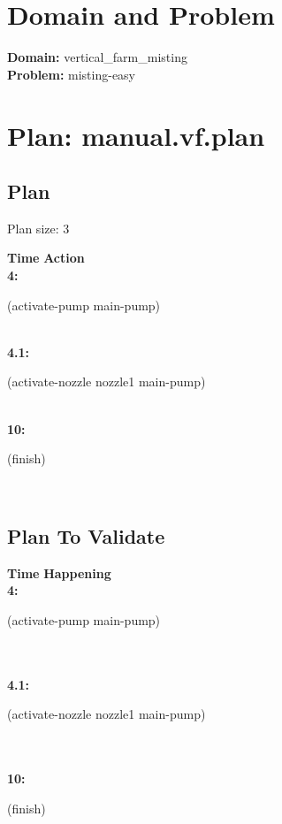 \documentclass[a4paper,12pt]{article}
\author{\mbox{\sc {\sc Val}}}
\newcommand{\headingtimeaction}{{\bf Time} \qquad \= {\bf Action}\\[0.8ex]}
\newcommand{\headingtimehappening}{{\bf Time} \qquad \= {\bf Happening}\\[0.8ex]}
\newcommand{\atime}[1]{{\bf #1:}}
\newcommand{\action}[1]{{\sf #1}}
\newcommand{\listrow}[1]{\begin{minipage}[t]{11.5cm} #1 \end{minipage}}
\begin{document}
 \maketitle 
\section{Domain and Problem}
{\bf Domain:} vertical\_farm\_misting\\
{\bf Problem:} misting-easy
\section{\sloppy Plan: manual.vf.plan}
\subsection{Plan}
Plan size: 3
\begin{tabbing}
\headingtimeaction 
\atime{4} \> \listrow{\action{(activate-pump main-pump)}}\\
\atime{4.1} \> \listrow{\action{(activate-nozzle nozzle1 main-pump)}}\\
\atime{10} \> \listrow{\action{(finish)}}\\
\end{tabbing}
\subsection{Plan To Validate}
\begin{tabbing}
\headingtimehappening 
\atime{4}  \> \listrow{\action{(activate-pump main-pump)}}\\
\\\atime{4.1}  \> \listrow{\action{(activate-nozzle nozzle1 main-pump)}}\\
\\\atime{10}  \> \listrow{\action{(finish)}}\\
\end{tabbing}
\end{document}
